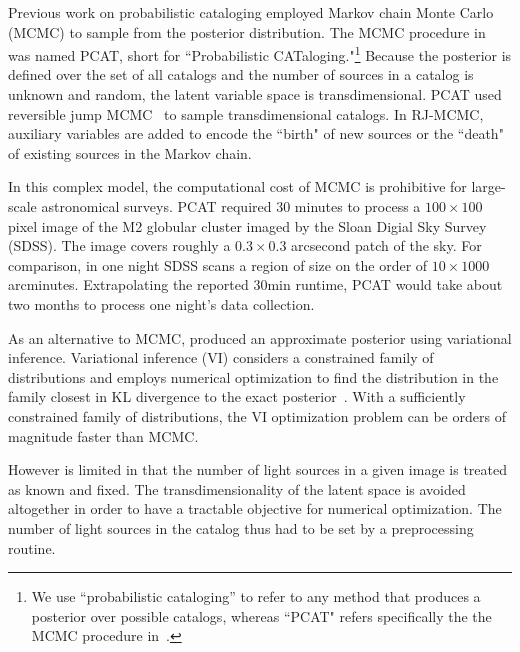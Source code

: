 Previous work on probabilistic cataloging employed Markov chain Monte Carlo (MCMC) to sample from the posterior distribution.
The MCMC procedure in~\cite{Portillo_2017, Feder_2019}
was named PCAT, short for ``Probabilistic CATaloging."\footnote{
We use ``probabilistic cataloging'' to refer to any method that produces a posterior over possible catalogs, whereas ``PCAT" refers specifically the the MCMC procedure in~\cite{Portillo_2017, Feder_2019}. }
Because the posterior is defined over the set of all catalogs and the number of sources in a catalog is unknown and random, 
the latent variable space is transdimensional. PCAT
used reversible jump MCMC~\cite{Green95reversiblejump} to sample transdimensional catalogs. In RJ-MCMC, auxiliary variables are added to encode the ``birth" of new sources 
or the ``death" of existing sources in the Markov chain.

In this complex model, the computational cost of MCMC is prohibitive for large-scale astronomical surveys. 
PCAT required 30 minutes to process a $100\times 100$ pixel image of the M2 globular cluster imaged by the Sloan Digial Sky Survey (SDSS). 
The image covers roughly a $0.3\times0.3$ arcsecond patch of the sky.
For comparison, in one night SDSS scans a region of size on the order of $10 \times 1000$ arcminutes. 
Extrapolating the reported 30min runtime, PCAT would take about two months to process one night's data collection.

As an alternative to MCMC, \cite{regier2019_celeste} produced an approximate posterior using variational inference.
Variational inference (VI) considers a constrained family of distributions and employs numerical optimization to find the distribution in the family closest
in KL divergence to the exact posterior~\cite{Blei_2017_vi_review,Jordan_intro_vi, Wainwrite_graph_models_vi}. 
With a sufficiently constrained family of distributions, the VI optimization problem can be orders of magnitude faster than MCMC. 

However \cite{regier2019_celeste} is limited in that the number of light sources in a given image is treated as known and fixed. The transdimensionality of the latent space is avoided altogether in order to have a tractable objective for numerical optimization. 
The number of light sources in the catalog thus had to be set by a preprocessing routine. 

\bigbreak


\nopagebreak[4]

